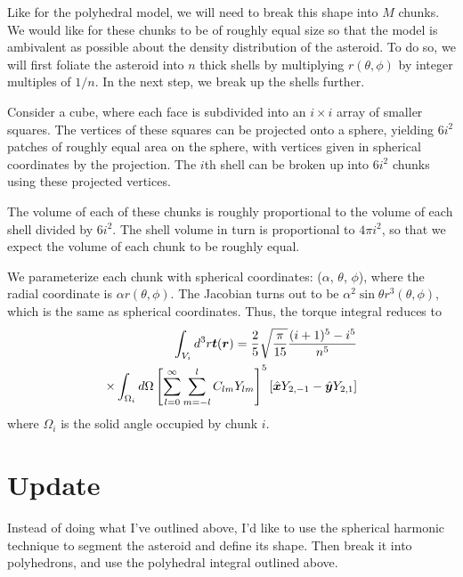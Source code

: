 \documentclass[aps,twocolumn,secnumarabic,balancelastpage,amsmath,amssymb,nofootinbib,floatfix]{revtex4-1}
\begin{document}
Like for the polyhedral model, we will need to break this shape into $M$ chunks. We would like for these chunks to be of roughly equal size so that the model is ambivalent as possible about the density distribution of the asteroid. To do so, we will first foliate the asteroid into $n$ thick shells by multiplying $r(\theta, \phi)$ by integer multiples of $1/n$. In the next step, we break up the shells further.

Consider a cube, where each face is subdivided into an $i\times i$ array of smaller squares. The vertices of these squares can be projected onto a sphere, yielding $6i^2$ patches of roughly equal area on the sphere, with vertices given in spherical coordinates by the projection. The $i$th shell can be broken up into $6i^2$ chunks using these projected vertices.

The volume of each of these chunks is roughly proportional to the volume of each shell divided by $6i^2$. The shell volume in turn is proportional to $4\pi i^2$, so that we expect the volume of each chunk to be roughly equal.



We parameterize each chunk with spherical coordinates: ($\alpha$, $\theta$, $\phi$), where the radial coordinate is $\alpha r(\theta, \phi)$. The Jacobian turns out to be $\alpha^2 \sin\theta r^3(\theta, \phi)$, which is the same as spherical coordinates. Thus, the torque integral reduces to 
\begin{equation}
    \begin{aligned}
    \int_{V_i} d^3 r \bm t(\bm r) = \frac{2}{5}\sqrt{\frac{\pi}{15}}\frac{(i+1)^5-i^5}{n^5}\\
    \times\int_{\Omega_i} d\Omega \left[ \sum_{l=0}^\infty\sum_{m=-l}^l C_{lm} Y_{lm} \right]^5\left[ \hat{\bm x} Y_{2, -1} - \hat{\bm y} Y_{2, 1} \right]
    \end{aligned}
\end{equation}
where $\Omega_i$ is the solid angle occupied by chunk $i$.

\section{Update}
Instead of doing what I've outlined above, I'd like to use the spherical harmonic technique to segment the asteroid and define its shape. Then break it into polyhedrons, and use the polyhedral integral outlined above.






\end{document}
